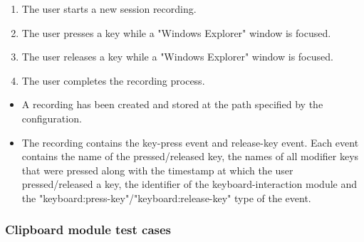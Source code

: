 \begin{tests}
	{\begin{enumerate}
		\item The \gls{user} starts a new \gls{session} recording.
		\item The \gls{user} presses a key while a "Windows Explorer" window is focused.
		\item The \gls{user} releases a key while a "Windows Explorer" window is focused.
		\item The \gls{user} completes the recording process.
	\end{enumerate}}
	{\begin{itemize}
		\item A recording has been created and stored at the path specified by the configuration.
		\item The recording contains the key-press \gls{event} and release-key event. Each \gls{event} contains the name of the pressed/released key, the names of all modifier keys that were pressed along with the timestamp at which the \gls{user} pressed/released a key, the identifier of the keyboard-interaction module and the "keyboard:press-key"/"keyboard:release-key" type of the event.
	\end{itemize}}
\end{tests}

\subsubsection{Clipboard module test cases}
	
